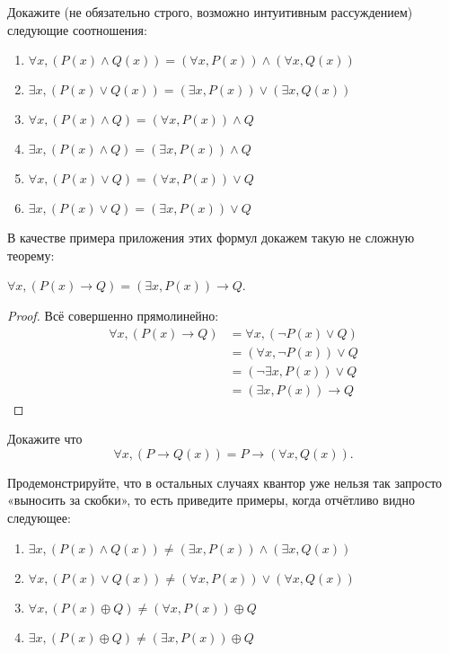 \begin{exercise} Докажите (не обязательно строго, возможно интуитивным рассуждением) следующие соотношения:
\begin{enumerate}
\item   $\forall x, (P(x) \wedge Q(x)) = (\forall x, P(x))\wedge (\forall x, Q(x))$
\item   $\exists x, (P(x) \vee Q(x)) = (\exists x, P(x))\vee (\exists x, Q(x))$
\item   $\forall x, (P(x) \wedge Q) = (\forall x, P(x))\wedge Q$
\item   $\exists x, (P(x) \wedge Q) = (\exists x, P(x))\wedge Q$
\item   $\forall x, (P(x) \vee Q) = (\forall x, P(x))\vee Q$
\item   $\exists x, (P(x) \vee Q) = (\exists x, P(x))\vee Q$
\end{enumerate}
\end{exercise}

В качестве примера приложения этих формул докажем такую не сложную теорему:

\begin{thm}$\forall x, (P(x)\to Q) = (\exists x, P(x))\to Q$.\end{thm}
\begin{proof}Всё совершенно прямолинейно:
\begin{align*}
\forall x, (P(x)\rightarrow Q) &= \forall x, (\neg P(x) \vee Q)\\
 &= (\forall x, \neg P(x)) \vee Q \\
&= (\neg\exists x, P(x))\vee Q\\
 &= (\exists x, P(x))\rightarrow Q
\end{align*}\end{proof}

\begin{exercise}Докажите что  $$\forall x, (P\to Q(x)) = P\to (\forall x, Q(x)).$$\end{exercise}

\begin{exercise}Продемонстрируйте, что в остальных случаях квантор уже нельзя так запросто «выносить за скобки», то есть приведите примеры, когда отчётливо видно следующее:
\begin{enumerate}
\item   $\exists x,(P(x)\wedge Q(x))\not=(\exists x, P(x))\wedge (\exists x,Q(x))$
\item   $\forall x, (P(x) \vee Q(x)) \not= (\forall x, P(x))\vee (\forall x, Q(x))$
\item   $\forall x, (P(x) \oplus Q) \not= (\forall x, P(x))\oplus Q$
\item   $\exists x, (P(x) \oplus Q) \not= (\exists x, P(x))\oplus Q$
\end{enumerate}
\end{exercise}
